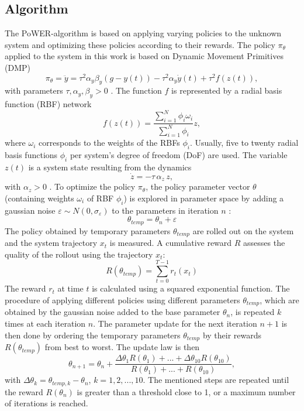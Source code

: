 \documentclass[letterpaper, 10 pt, conference]{ieeeconf}  %
\begin{document}
\subsection{Algorithm}
The PoWER-algorithm is based on applying varying policies to the unknown system and optimizing these policies according to their rewards.
The policy $\pi_\theta$ applied to the system in this work is based on Dynamic Movement Primitives (DMP)
\begin{equation}
\pi_{\theta}=\ddot{y}=\tau^{2}\alpha_y\beta_y(g-y(t))-\tau^{2}\alpha_y \dot{y}(t)+\tau^{2}f(z(t)),
\end{equation}
with parameters $\tau,\alpha_y, \beta_y>0$ \cite{DMP_web}.
The function $f$ is represented by a radial basis function (RBF) network 
\begin{equation}
f(z(t))=\frac{\sum_{i=1}^N \phi_i \omega_i}{\sum_{i=1}^N \phi_i}z ,
\end{equation}
where $\omega_i$ corresponds to the weights of the RBFs $\phi_i$. Usually, five to twenty radial basis functions $\phi_i$ per system's degree of freedom (DoF) are used. The variable $z(t)$ is a system state resulting from the dynamics 
\begin{equation}
\dot{z}=-\tau\,\alpha_z \,z,
\end{equation}
with $\alpha_z>0$ \cite{DMP_web}.
To optimize the policy $\pi_\theta$, the policy parameter vector $\theta$ (containing weights $\omega_i$ of RBF $\phi_i$) is explored in parameter space by adding a gaussian noise $\varepsilon \sim N(0,\sigma_{\varepsilon})$ to the parameters in iteration $n$ \cite{kober2009policy}:
\begin{equation}
\theta_{temp}=\theta_n+\varepsilon
\end{equation}
The policy obtained by temporary parameters $\theta_{temp}$ are rolled out on the system and the system trajectory $x_t$ is measured. A cumulative reward $R$ assesses the quality of the rollout using the trajectory $x_t$: %
\begin{equation}
R(\theta_{temp})=\sum_{t=0}^{T-1} r_t(x_t) 
\end{equation}
The reward $r_t$ at time $t$ is calculated using a squared exponential function. The procedure of applying different policies using different parameters $\theta_{temp}$, which are obtained by the gaussian noise added to the base parameter $\theta_n$, is repeated $k$ times at each iteration $n$. The parameter update for the next iteration $n+1$ is then done by ordering the temporary parameters $\theta_{temp}$ by their rewards $R(\theta_{temp})$ from best to worst. The update law is then
\begin{equation}
\theta_{n+1}=\theta_n+\frac{\Delta\theta_1 R(\theta_1)+...+\Delta\theta_{10} R(\theta_{10})}{R(\theta_1)+...+R(\theta_{10})},
\end{equation}
with $\Delta\theta_k=\theta_{temp,k}-\theta_n$, $k=1,2,...,10$. 
The mentioned steps are repeated until the reward $R(\theta_n)$ is greater than a threshold close to 1, or a maximum number of iterations is reached.
\end{document}
